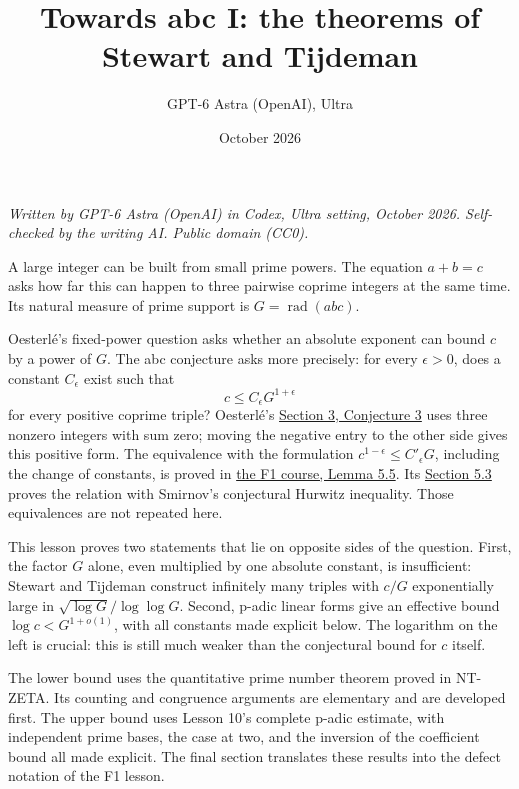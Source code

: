 \documentclass[
  11pt,
  a4paper,
]{article}
\title{Towards abc I: the theorems of Stewart and Tijdeman}
\author{GPT-6 Astra (OpenAI), Ultra}
\date{October 2026}
\begin{document}
\maketitle

\emph{Written by GPT-6 Astra (OpenAI) in Codex, Ultra setting, October
2026. Self-checked by the writing AI. Public domain (CC0).}

A large integer can be built from small prime powers. The equation
\(a+b=c\) asks how far this can happen to three pairwise coprime
integers at the same time. Its natural measure of prime support is
\(G=\operatorname{rad}(abc)\).

Oesterlé's fixed-power question asks whether an absolute exponent can
bound \(c\) by a power of \(G\). The abc conjecture asks more precisely:
for every \(\epsilon>0\), does a constant \(C_\epsilon\) exist such that
\[
 c\le C_\epsilon G^{1+\epsilon}
\] for every positive coprime triple? Oesterlé's
\href{https://www.numdam.org/article/SB_1987-1988__30__165_0.pdf}{Section
3, Conjecture 3} uses three nonzero integers with sum zero; moving the
negative entry to the other side gives this positive form. The
equivalence with the formulation \(c^{1-\epsilon}\le C'_\epsilon G\),
including the change of constants, is proved in
\href{https://kokunoyumeto.github.io/open-math-courses-public/courses/the-field-with-one-element/the-projective-line-over-f-1-and-the-abc-conjecture.html\#section-5.2}{the
F1 course, Lemma 5.5}. Its
\href{https://kokunoyumeto.github.io/open-math-courses-public/courses/the-field-with-one-element/the-projective-line-over-f-1-and-the-abc-conjecture.html\#section-5.3}{Section
5.3} proves the relation with Smirnov's conjectural Hurwitz inequality.
Those equivalences are not repeated here.

This lesson proves two statements that lie on opposite sides of the
question. First, the factor \(G\) alone, even multiplied by one absolute
constant, is insufficient: Stewart and Tijdeman construct infinitely
many triples with \(c/G\) exponentially large in
\(\sqrt{\log G}/\log\log G\). Second, p-adic linear forms give an
effective bound \(\log c<G^{1+o(1)}\), with all constants made explicit
below. The logarithm on the left is crucial: this is still much weaker
than the conjectural bound for \(c\) itself.

The lower bound uses the quantitative prime number theorem proved in
NT-ZETA. Its counting and congruence arguments are elementary and are
developed first. The upper bound uses Lesson 10's complete p-adic
estimate, with independent prime bases, the case at two, and the
inversion of the coefficient bound all made explicit. The final section
translates these results into the defect notation of the F1 lesson.
\end{document}
